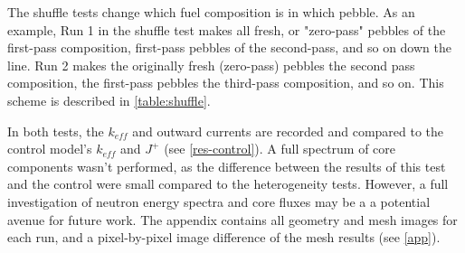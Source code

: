 


The shuffle tests change which fuel composition is in which pebble.  As an example, Run 1 in the shuffle test makes all fresh, or "zero-pass" pebbles of the first-pass composition, first-pass pebbles of the second-pass, and so on down the line.  Run 2 makes the originally fresh (zero-pass) pebbles the second pass composition, the first-pass pebbles the third-pass composition, and so on. This scheme is described in \ref{table:shuffle}.



In both tests, the $k_{eff}$ and outward currents are recorded and compared to the control model's $k_{eff}$ and $J^+$ (see \autoref{res-control}).  A full spectrum of core components wasn't performed, as the difference between the results of this test and the control were small compared to the heterogeneity tests.  However, a full investigation of neutron energy spectra and core fluxes may be a a potential avenue for future work.  The appendix contains all geometry and mesh images for each run, and a pixel-by-pixel image difference of the mesh results (see \autoref{app}).